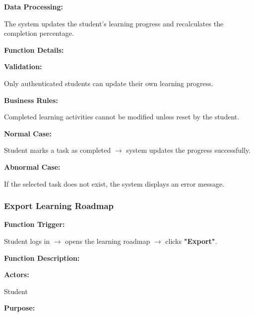 \vspace{0.2cm}

\textbf{Data Processing:}

The system updates the student's learning progress and recalculates the completion percentage.

\vspace{0.3cm}

\textbf{Function Details:}

\textbf{Validation:}

Only authenticated students can update their own learning progress.

\textbf{Business Rules:}

Completed learning activities cannot be modified unless reset by the student.

\textbf{Normal Case:}

Student marks a task as completed $\rightarrow$ system updates the progress successfully.

\textbf{Abnormal Case:}

If the selected task does not exist, the system displays an error message.

%

\subsubsection{Export Learning Roadmap}

\textbf{Function Trigger:}

Student logs in $\rightarrow$ opens the learning roadmap $\rightarrow$ clicks \textbf{"Export"}.

\vspace{0.3cm}

\textbf{Function Description:}

\textbf{Actors:}

Student

\vspace{0.2cm}

\textbf{Purpose:}

